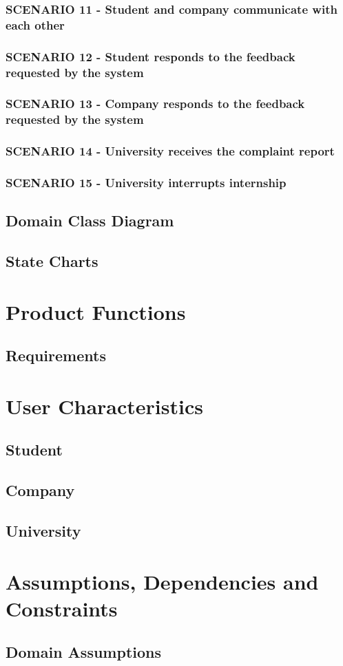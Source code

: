 \subsubsection{SCENARIO 11 - Student and company communicate with each other}
\subsubsection{SCENARIO 12 - Student responds to the feedback requested by the system}
\subsubsection{SCENARIO 13 - Company responds to the feedback requested by the system}
\subsubsection{SCENARIO 14 - University receives the complaint report}
\subsubsection{SCENARIO 15 - University interrupts internship}
\subsection{Domain Class Diagram}
\subsection{State Charts}

\section{Product Functions}
\subsection{Requirements}

\section{User Characteristics}
\subsection{Student}
\subsection{Company}
\subsection{University}

\section{Assumptions, Dependencies and Constraints}
\subsection{Domain Assumptions}